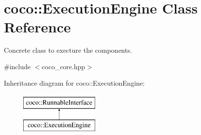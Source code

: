 \hypertarget{classcoco_1_1_execution_engine}{}\section{coco\+:\+:Execution\+Engine Class Reference}
\label{classcoco_1_1_execution_engine}


Concrete class to execture the components.  




{\ttfamily \#include $<$coco\+\_\+core.\+hpp$>$}

Inheritance diagram for coco\+:\+:Execution\+Engine\+:\begin{figure}[H]
\begin{center}
\leavevmode
\includegraphics[height=2.000000cm]{classcoco_1_1_execution_engine}
\end{center}
\end{figure}
